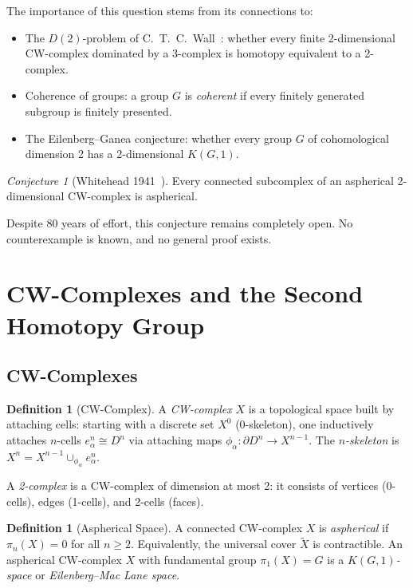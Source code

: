 \documentclass[12pt,a4paper]{amsart}
\theoremstyle{definition}
\newtheorem{definition}[theorem]{Definition}
\theoremstyle{remark}
\newtheorem{conjecture}[theorem]{Conjecture}
\begin{document}
The importance of this question stems from its connections to:
\begin{itemize}
\item The $D(2)$-problem of C.~T.~C.~Wall~\cite{Wall1965}: whether every
      finite 2-dimensional CW-complex dominated by a 3-complex is homotopy
      equivalent to a 2-complex.
\item Coherence of groups: a group $G$ is \emph{coherent} if every
      finitely generated subgroup is finitely presented.
\item The Eilenberg--Ganea conjecture: whether every group $G$ of
      cohomological dimension 2 has a 2-dimensional $K(G,1)$.
\end{itemize}

\begin{conjecture}[Whitehead 1941~\cite{Whitehead1941}]
\label{conj:Whitehead}
Every connected subcomplex of an aspherical 2-dimensional CW-complex is
aspherical.
\end{conjecture}

Despite 80 years of effort, this conjecture remains completely open.
No counterexample is known, and no general proof exists.

\section{CW-Complexes and the Second Homotopy Group}

\subsection{CW-Complexes}

\begin{definition}[CW-Complex]
A \emph{CW-complex} $X$ is a topological space built by attaching cells:
starting with a discrete set $X^0$ (0-skeleton), one inductively attaches
$n$-cells $e_\alpha^n \cong D^n$ via attaching maps
$\phi_\alpha \colon \partial D^n \to X^{n-1}$. The \emph{$n$-skeleton} is
$X^n = X^{n-1} \cup_{\phi_\alpha} e_\alpha^n$.
\end{definition}

A \emph{2-complex} is a CW-complex of dimension at most 2: it consists of
vertices (0-cells), edges (1-cells), and 2-cells (faces).

\begin{definition}[Aspherical Space]
A connected CW-complex $X$ is \emph{aspherical} if
$\pi_n(X) = 0$ for all $n \geq 2$.
Equivalently, the universal cover $\widetilde{X}$ is contractible.
An aspherical CW-complex $X$ with fundamental group $\pi_1(X) = G$ is a
\emph{$K(G,1)$-space} or \emph{Eilenberg--Mac Lane space}.
\end{definition}
\end{document}
